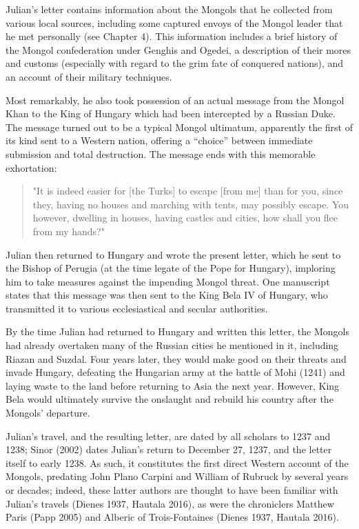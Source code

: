 Julian's letter contains information about the Mongols that he collected from various local sources, including some captured envoys of the Mongol leader that he met personally (see Chapter 4). This information includes a brief history of the Mongol confederation under Genghis and Ogedei, a description of their mores and customs (especially with regard to the grim fate of conquered nations), and an account of their military techniques.

Most remarkably, he also took possession of an actual message from the Mongol Khan to the King of Hungary which had been intercepted by a Russian Duke. The message turned out to be a typical Mongol ultimatum, apparently the first of its kind sent to a Western nation, offering a ``choice'' between immediate submission and total destruction. The message ends with this memorable exhortation:

\begin{quote}
"It is indeed easier for [the Turks] to escape [from me] than for you, since they, having no houses and marching with tents, may possibly escape. You however, dwelling in houses, having castles and cities, how shall you flee from my hands?"
\end{quote}

Julian then returned to Hungary and wrote the present letter, which he sent to the Bishop of Perugia (at the time legate of the Pope for Hungary), imploring him to take measures against the impending Mongol threat. One manuscript states that this message was then sent to the King Bela IV of Hungary, who transmitted it to various ecclesiastical and secular authorities. 

By the time Julian had returned to Hungary and written this letter, the Mongols had already overtaken many of the Russian cities he mentioned in it, including Riazan and Suzdal. Four years later, they would make good on their threats and invade Hungary, defeating the Hungarian army at the battle of Mohi (1241) and laying waste to the land before returning to Asia the next year. However, King Bela would ultimately survive the onslaught and rebuild his country after the Mongols' departure.

Julian's travel, and the resulting letter, are dated by all scholars to 1237 and 1238; Sinor (2002) dates Julian's return to December 27, 1237, and the letter itself to early 1238. As such, it constitutes the first direct Western account of the Mongols, predating John Plano Carpini and William of Rubruck by several years or decades; indeed, these latter authors are thought to have been familiar with Julian's travels (Dienes 1937, Hautala 2016), as were the chroniclers Matthew Paris (Papp 2005) and Alberic of Trois-Fontaines (Dienes 1937, Hautala 2016). 

